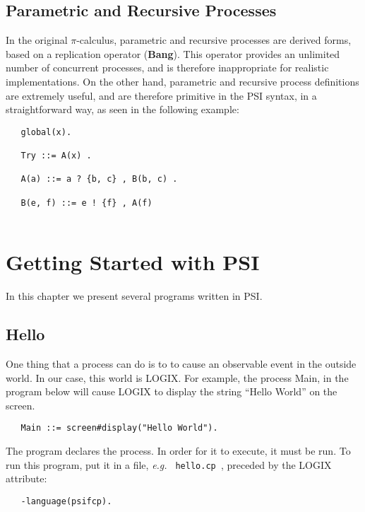 \section{Parametric and Recursive Processes}

In the original $\pi$-calculus, parametric and recursive processes are
derived forms, based on a replication operator ({\bf Bang}).  This operator
provides an unlimited number of concurrent processes, and is therefore
inappropriate for realistic implementations. On the other hand,
parametric and recursive process definitions are extremely useful, and
are therefore primitive in the PSI syntax, in a straightforward way,
as seen in the following example:

\begin{verbatim}
   global(x).

   Try ::= A(x) .

   A(a) ::= a ? {b, c} , B(b, c) .

   B(e, f) ::= e ! {f} , A(f) 
 
\end{verbatim}


\chapter{Getting Started with PSI}
\label{simple programs}

In this chapter we present several programs written in PSI.

\section{Hello}

One thing that a process can do is to to cause an observable
event in the outside world. In our case, this world is LOGIX.
For example, the process Main, in the program below will cause
LOGIX to display the string ``Hello World'' on the screen.

\begin{verbatim}
   Main ::= screen#display("Hello World").
\end{verbatim}

\noindent

The program declares the process. In order for it to execute,
it must be run.  To run this program, put it in a file,
{\em e.g.} \verb+ hello.cp +, preceded by the LOGIX attribute:

\begin{verbatim}
   -language(psifcp).
\end{verbatim}

